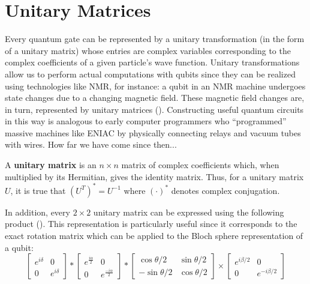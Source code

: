 \section{Unitary Matrices}
Every quantum gate can be represented by a unitary transformation (in the form of a unitary matrix) whose entries are complex variables corresponding to the complex coefficients of a given particle's wave function. Unitary transformations allow us to perform actual computations with qubits since they can be realized using technologies like NMR, for instance: a qubit in an NMR machine undergoes state changes due to a changing magnetic field. These magnetic field changes are, in turn, represented by unitary matrices (\cite{Lukac2003}). Constructing useful quantum circuits in this way is analogous to early computer programmers who ``programmed'' massive machines like ENIAC by physically connecting relays and vacuum tubes with wires. How far we have come since then...

\begin{mydef}
 A {\bf unitary matrix} is an $n \times n$ matrix of complex coefficients which, when multiplied by its Hermitian, gives the identity matrix. Thus, for a unitary matrix $U$, it is true that $(U^{T})^{*} = U^{-1}$ where $(\cdot)^{*}$ denotes complex conjugation.
\end{mydef}

In addition, every $2 \times 2$ unitary matrix can be expressed using the following product (\cite{Barenco1995}). This representation is particularly useful since it corresponds to the exact rotation matrix which can be applied to the Bloch sphere representation of a qubit: \\
\[ \left[
 \begin{matrix}
  e^{i\delta} & 0 \\
  0 & e^{i\delta}
 \end{matrix}
  \right] *
  \left[
  \begin{matrix}
   e^{\frac{i\alpha}{2}} & 0 \\
   0 & e^{\frac{-i\alpha}{2}}
  \end{matrix}
  \right] *
  \left[
  \begin{matrix}
   \cos{\theta/2} & \sin{\theta/2} \\
   -\sin{\theta/2}& \cos{\theta/2}
  \end{matrix}
  \right] \times
  \left[
  \begin{matrix}
  e^{i\beta/2} & 0 \\
  0 & e^{-i\beta/2}
  \end{matrix}
  \right]
\]

